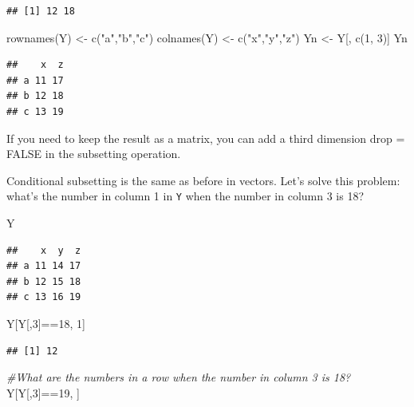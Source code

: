 \documentclass[
]{book}
\newenvironment{Shaded}{\begin{snugshade}}{\end{snugshade}}
\newcommand{\CommentTok}[1]{\textcolor[rgb]{0.56,0.35,0.01}{\textit{#1}}}
\newcommand{\DecValTok}[1]{\textcolor[rgb]{0.00,0.00,0.81}{#1}}
\newcommand{\FunctionTok}[1]{\textcolor[rgb]{0.00,0.00,0.00}{#1}}
\newcommand{\NormalTok}[1]{#1}
\newcommand{\OtherTok}[1]{\textcolor[rgb]{0.56,0.35,0.01}{#1}}
\newcommand{\SpecialCharTok}[1]{\textcolor[rgb]{0.00,0.00,0.00}{#1}}
\newcommand{\StringTok}[1]{\textcolor[rgb]{0.31,0.60,0.02}{#1}}
\begin{document}
\begin{verbatim}
## [1] 12 18
\end{verbatim}

\begin{Shaded}
\begin{Highlighting}[]
\FunctionTok{rownames}\NormalTok{(Y) }\OtherTok{\textless{}{-}} \FunctionTok{c}\NormalTok{(}\StringTok{"a"}\NormalTok{,}\StringTok{"b"}\NormalTok{,}\StringTok{"c"}\NormalTok{)}
\FunctionTok{colnames}\NormalTok{(Y) }\OtherTok{\textless{}{-}} \FunctionTok{c}\NormalTok{(}\StringTok{"x"}\NormalTok{,}\StringTok{"y"}\NormalTok{,}\StringTok{"z"}\NormalTok{)}
\NormalTok{Yn }\OtherTok{\textless{}{-}}\NormalTok{ Y[, }\FunctionTok{c}\NormalTok{(}\DecValTok{1}\NormalTok{, }\DecValTok{3}\NormalTok{)]}
\NormalTok{Yn}
\end{Highlighting}
\end{Shaded}

\begin{verbatim}
##    x  z
## a 11 17
## b 12 18
## c 13 19
\end{verbatim}

If you need to keep the result as a matrix, you can add a third dimension drop = FALSE in the subsetting operation.

Conditional subsetting is the same as before in vectors. Let's solve this problem: what's the number in column 1 in \texttt{Y} when the number in column 3 is 18?

\begin{Shaded}
\begin{Highlighting}[]
\NormalTok{Y}
\end{Highlighting}
\end{Shaded}

\begin{verbatim}
##    x  y  z
## a 11 14 17
## b 12 15 18
## c 13 16 19
\end{verbatim}

\begin{Shaded}
\begin{Highlighting}[]
\NormalTok{Y[Y[,}\DecValTok{3}\NormalTok{]}\SpecialCharTok{==}\DecValTok{18}\NormalTok{, }\DecValTok{1}\NormalTok{]}
\end{Highlighting}
\end{Shaded}

\begin{verbatim}
## [1] 12
\end{verbatim}

\begin{Shaded}
\begin{Highlighting}[]
\CommentTok{\#What are the numbers in a row when the number in column 3 is 18?}
\NormalTok{Y[Y[,}\DecValTok{3}\NormalTok{]}\SpecialCharTok{==}\DecValTok{19}\NormalTok{, ]}
\end{Highlighting}
\end{Shaded}
\end{document}
